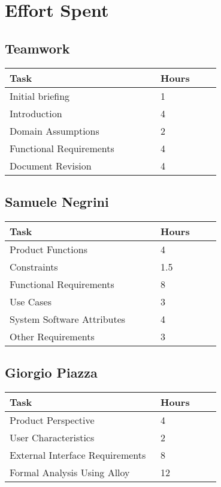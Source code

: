 \chapter{Effort Spent}

\section{Teamwork}
\vspace{2mm}
\begin{center}
    \begin{tabular}{@{}p{0.5\linewidth} p{0.2\linewidth}@{}}
        \hline
        \textbf{Task} & \textbf{Hours} \\ \hline
        Initial briefing & 1 \\ \hline
        Introduction & 4 \\ \hline
        Domain Assumptions & 2 \\ \hline
        Functional Requirements & 4 \\ \hline
        Document Revision & 4 \\ \hline
    \end{tabular}
\end{center}

\section{Samuele Negrini}
\vspace{2mm}
\begin{center}
	\begin{tabular}{@{}p{0.5\linewidth} p{0.2\linewidth}@{}}
		\hline
		\textbf{Task} & \textbf{Hours} \\ \hline
		Product Functions & 4 \\ \hline
		Constraints & 1.5 \\ \hline
        Functional Requirements & 8 \\ \hline
        Use Cases & 3 \\ \hline
        System Software Attributes & 4 \\ \hline
        Other Requirements & 3 \\ \hline
	\end{tabular}
\end{center}

\section{Giorgio Piazza}
\vspace{2mm}
\begin{center}
	\begin{tabular}{@{}p{0.5\linewidth} p{0.2\linewidth}@{}}
		\hline
		\textbf{Task} & \textbf{Hours} \\ \hline
		Product Perspective & 4 \\ \hline
		User Characteristics & 2 \\ \hline
		External Interface Requirements & 8 \\ \hline
		Formal Analysis Using Alloy & 12 \\ \hline 
	\end{tabular}
\end{center}